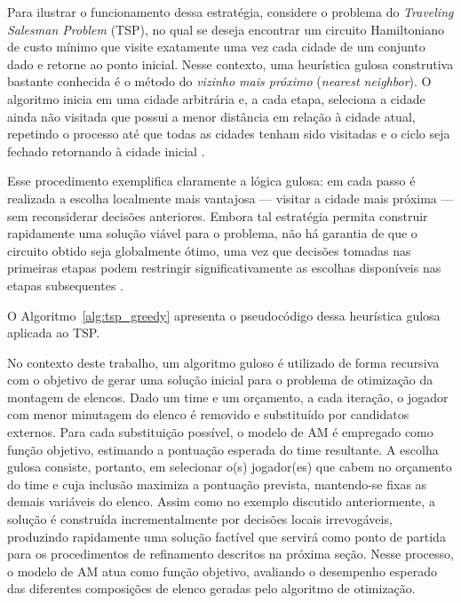 Para ilustrar o funcionamento dessa estratégia, considere o problema do \textit{Traveling Salesman Problem} (TSP), no qual se deseja encontrar um circuito
Hamiltoniano de custo mínimo que visite exatamente uma vez cada cidade de um conjunto dado e retorne ao ponto inicial. Nesse contexto, uma heurística gulosa
construtiva bastante conhecida é o método do \textit{vizinho mais próximo} (\textit{nearest neighbor}). O algoritmo inicia em uma cidade arbitrária e,
a cada etapa, seleciona a cidade ainda não visitada que possui a menor distância em relação à cidade atual, repetindo o processo até que todas as
cidades tenham sido visitadas e o ciclo seja fechado retornando à cidade inicial \cite{Gendreau2010}.

Esse procedimento exemplifica claramente a lógica gulosa: em cada passo é realizada a escolha localmente mais vantajosa — visitar a cidade mais próxima —
sem reconsiderar decisões anteriores. Embora tal estratégia permita construir rapidamente uma solução viável para o problema, não há garantia de que o
circuito obtido seja globalmente ótimo, uma vez que decisões tomadas nas primeiras etapas podem restringir significativamente as escolhas disponíveis
nas etapas subsequentes \cite{Gendreau2010}.

O Algoritmo~\ref{alg:tsp_greedy} apresenta o pseudocódigo dessa heurística gulosa aplicada ao TSP.



No contexto deste trabalho, um algoritmo guloso é utilizado de forma recursiva com o objetivo de gerar uma solução inicial para o problema de otimização da
montagem de elencos. Dado um time e um orçamento, a cada iteração, o jogador com menor minutagem do elenco é removido e substituído por candidatos externos.
Para cada substituição possível, o modelo de AM é empregado como função objetivo, estimando a pontuação esperada do time resultante. A escolha gulosa
consiste, portanto, em selecionar o(s) jogador(es) que cabem no orçamento do time e cuja inclusão maximiza a pontuação prevista, mantendo-se fixas as
demais variáveis do elenco. Assim como no exemplo discutido anteriormente, a solução é construída incrementalmente por decisões locais irrevogáveis,
produzindo rapidamente uma solução factível que servirá como ponto de partida para os procedimentos de refinamento descritos na próxima seção. 
Nesse processo, o modelo de AM atua como função objetivo, avaliando o desempenho esperado das diferentes composições de elenco geradas pelo algoritmo
de otimização.

